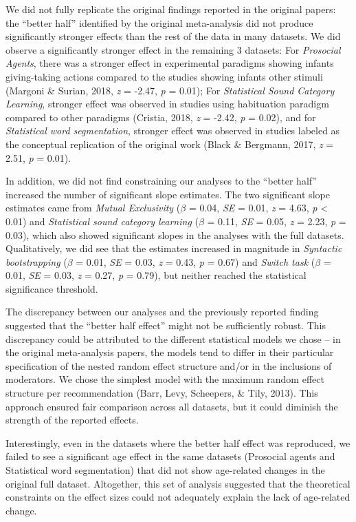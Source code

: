 \documentclass[
  man]{apa6}
\begin{document}
We did not fully replicate the original findings reported in the original papers: the ``better half'' identified by the original meta-analysis did not produce significantly stronger effects than the rest of the data in many datasets. We did observe a significantly stronger effect in the remaining 3 datasets: For \emph{Prosocial Agents}, there was a stronger effect in experimental paradigms showing infants giving-taking actions compared to the studies showing infants other stimuli (Margoni \& Surian, 2018, \emph{z} = -2.47, \emph{p} = 0.01); For \emph{Statistical Sound Category Learning}, stronger effect was observed in studies using habituation paradigm compared to other paradigms (Cristia, 2018, \emph{z} = -2.42, \emph{p} = 0.02), and for \emph{Statistical word segmentation}, stronger effect was observed in studies labeled as the conceptual replication of the original work (Black \& Bergmann, 2017, \emph{z} = 2.51, \emph{p} = 0.01).

In addition, we did not find constraining our analyses to the ``better half'' increased the number of significant slope estimates. The two significant slope estimates came from \emph{Mutual Exclusivity} (\(\beta\) = 0.04, \emph{SE} = 0.01, \emph{z} = 4.63, \emph{p} \textless{} 0.01) and \emph{Statistical sound category learning} (\(\beta\) = 0.11, \emph{SE} = 0.05, \emph{z} = 2.23, \emph{p} = 0.03), which also showed significant slopes in the analyses with the full datasets. Qualitatively, we did see that the estimates increased in magnitude in \emph{Syntactic bootstrapping} (\(\beta\) = 0.01, \emph{SE} = 0.03, \emph{z} = 0.43, \emph{p} = 0.67) and \emph{Switch task} (\(\beta\) = 0.01, \emph{SE} = 0.03, \emph{z} = 0.27, \emph{p} = 0.79), but neither reached the statistical significance threshold.

The discrepancy between our analyses and the previously reported finding suggested that the ``better half effect'' might not be sufficiently robust. This discrepancy could be attributed to the different statistical models we chose -- in the original meta-analysis papers, the models tend to differ in their particular specification of the nested random effect structure and/or in the inclusions of moderators. We chose the simplest model with the maximum random effect structure per recommendation (Barr, Levy, Scheepers, \& Tily, 2013). This approach ensured fair comparison across all datasets, but it could diminish the strength of the reported effects.

Interestingly, even in the datasets where the better half effect was reproduced, we failed to see a significant age effect in the same datasets (Prosocial agents and Statistical word segmentation) that did not show age-related changes in the original full dataset. Altogether, this set of analysis suggested that the theoretical constraints on the effect sizes could not adequately explain the lack of age-related change.
\end{document}

